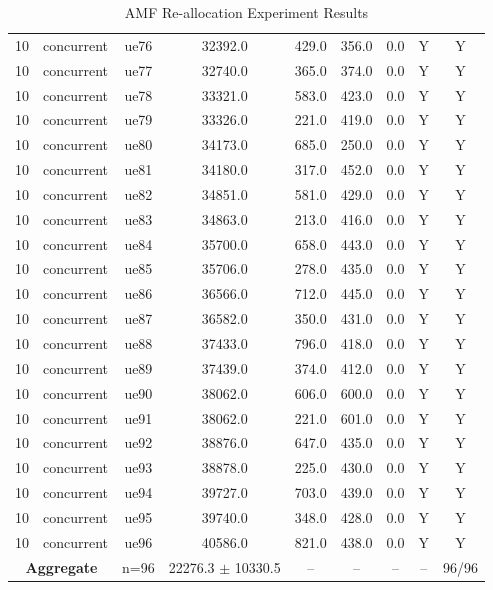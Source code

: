 \begin{table}[ht]
\begin{tabular}{|c|c|c|c|c|c|c|c|c|}
10 & concurrent & ue76 & 32392.0 & 429.0 & 356.0 & 0.0 & Y & Y \\
10 & concurrent & ue77 & 32740.0 & 365.0 & 374.0 & 0.0 & Y & Y \\
10 & concurrent & ue78 & 33321.0 & 583.0 & 423.0 & 0.0 & Y & Y \\
10 & concurrent & ue79 & 33326.0 & 221.0 & 419.0 & 0.0 & Y & Y \\
10 & concurrent & ue80 & 34173.0 & 685.0 & 250.0 & 0.0 & Y & Y \\
10 & concurrent & ue81 & 34180.0 & 317.0 & 452.0 & 0.0 & Y & Y \\
10 & concurrent & ue82 & 34851.0 & 581.0 & 429.0 & 0.0 & Y & Y \\
10 & concurrent & ue83 & 34863.0 & 213.0 & 416.0 & 0.0 & Y & Y \\
10 & concurrent & ue84 & 35700.0 & 658.0 & 443.0 & 0.0 & Y & Y \\
10 & concurrent & ue85 & 35706.0 & 278.0 & 435.0 & 0.0 & Y & Y \\
10 & concurrent & ue86 & 36566.0 & 712.0 & 445.0 & 0.0 & Y & Y \\
10 & concurrent & ue87 & 36582.0 & 350.0 & 431.0 & 0.0 & Y & Y \\
10 & concurrent & ue88 & 37433.0 & 796.0 & 418.0 & 0.0 & Y & Y \\
10 & concurrent & ue89 & 37439.0 & 374.0 & 412.0 & 0.0 & Y & Y \\
10 & concurrent & ue90 & 38062.0 & 606.0 & 600.0 & 0.0 & Y & Y \\
10 & concurrent & ue91 & 38062.0 & 221.0 & 601.0 & 0.0 & Y & Y \\
10 & concurrent & ue92 & 38876.0 & 647.0 & 435.0 & 0.0 & Y & Y \\
10 & concurrent & ue93 & 38878.0 & 225.0 & 430.0 & 0.0 & Y & Y \\
10 & concurrent & ue94 & 39727.0 & 703.0 & 439.0 & 0.0 & Y & Y \\
10 & concurrent & ue95 & 39740.0 & 348.0 & 428.0 & 0.0 & Y & Y \\
10 & concurrent & ue96 & 40586.0 & 821.0 & 438.0 & 0.0 & Y & Y \\
\multicolumn{2}{|c|}{\textbf{Aggregate}} & n=96 & 22276.3 $\pm$ 10330.5 & -- & -- & -- & -- & 96/96 \\
\hline
\end{tabular}
\caption{AMF Re-allocation Experiment Results}
\label{tab:amf_realloc}
\end{table}

